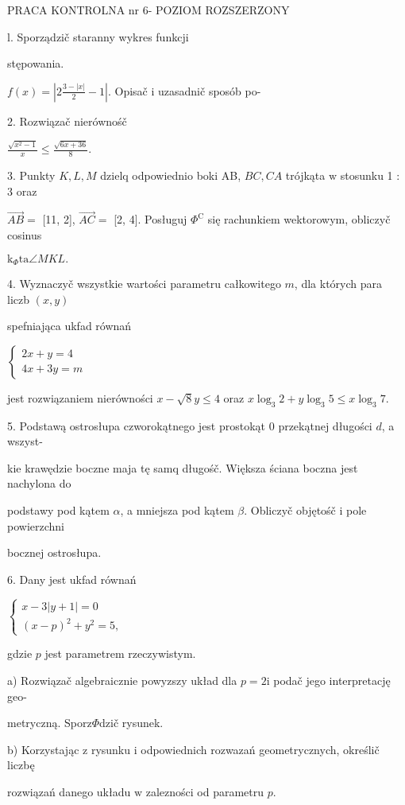 \documentclass[a4paper,12pt]{article}
\begin{document}
PRACA KONTROLNA nr 6- POZIOM ROZSZERZONY

l. Sporządzič staranny wykres funkcji

stępowania.

$f(x)= |2\displaystyle \frac{3-|x|}{2}-1|$. Opisač $\mathrm{i}$ uzasadnič sposób po-

2. Rozwiązač nierównośč

$\displaystyle \frac{\sqrt{x^{2}-1}}{x}\leq\frac{\sqrt{6x+36}}{8}.$

3. Punkty $K, L, M$ dzielq odpowiednio boki AB, $BC, CA$ trójkąta $\mathrm{w}$ stosunku 1 : 3 oraz

$\vec{AB} =$ [11, 2], $\vec{AC} =$ [2, 4]. Posługuj $\Phi^{\mathrm{C}}$ się rachunkiem wektorowym, obliczyč cosinus

$\mathrm{k}_{\Phi}\mathrm{t}\mathrm{a}\angle MKL.$

4. Wyznaczyč wszystkie wartości parametru całkowitego $m$, dla których para liczb $(x,y)$

spefniająca ukfad równań

$\left\{\begin{array}{l}
2x+y=4\\
4x+3y=m
\end{array}\right.$

jest rozwiązaniem nierówności $x-\sqrt{8}y\leq 4$ oraz $x\log_{3}2+y\log_{3}5\leq x\log_{3}7.$

5. Podstawą ostrosłupa czworokątnego jest prostokąt $0$ przekątnej długości $d$, a wszyst-

kie krawędzie boczne maja tę samq długośč. Większa ściana boczna jest nachylona do

podstawy pod kątem $\alpha$, a mniejsza pod kątem $\beta$. Obliczyč objętośč $\mathrm{i}$ pole powierzchni

bocznej ostrosłupa.

6. Dany jest ukfad równań

$\left\{\begin{array}{l}
x-3|y+1|=0\\
(x-p)^{2}+y^{2}=5,
\end{array}\right.$

gdzie $p$ jest parametrem rzeczywistym.

a) Rozwiązač algebraicznie powyzszy układ dla $p=2\mathrm{i}$ podač jego interpretację geo-

metryczną. Sporz$\Phi$dzič rysunek.

b) Korzystając $\mathrm{z}$ rysunku $\mathrm{i}$ odpowiednich rozwazań geometrycznych, określič liczbę

rozwiązań danego układu $\mathrm{w}$ zalezności od parametru $p.$
\end{document}
